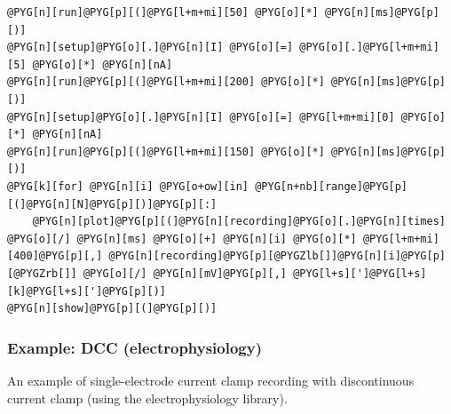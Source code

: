 \documentclass[letterpaper,10pt,english]{manual}
\begin{document}
\begin{Verbatim}[commandchars=@\[\]]
@PYG[n][run]@PYG[p][(]@PYG[l+m+mi][50] @PYG[o][*] @PYG[n][ms]@PYG[p][)]
@PYG[n][setup]@PYG[o][.]@PYG[n][I] @PYG[o][=] @PYG[o][.]@PYG[l+m+mi][5] @PYG[o][*] @PYG[n][nA]
@PYG[n][run]@PYG[p][(]@PYG[l+m+mi][200] @PYG[o][*] @PYG[n][ms]@PYG[p][)]
@PYG[n][setup]@PYG[o][.]@PYG[n][I] @PYG[o][=] @PYG[l+m+mi][0] @PYG[o][*] @PYG[n][nA]
@PYG[n][run]@PYG[p][(]@PYG[l+m+mi][150] @PYG[o][*] @PYG[n][ms]@PYG[p][)]
@PYG[k][for] @PYG[n][i] @PYG[o+ow][in] @PYG[n+nb][range]@PYG[p][(]@PYG[n][N]@PYG[p][)]@PYG[p][:]
    @PYG[n][plot]@PYG[p][(]@PYG[n][recording]@PYG[o][.]@PYG[n][times] @PYG[o][/] @PYG[n][ms] @PYG[o][+] @PYG[n][i] @PYG[o][*] @PYG[l+m+mi][400]@PYG[p][,] @PYG[n][recording]@PYG[p][@PYGZlb[]]@PYG[n][i]@PYG[p][@PYGZrb[]] @PYG[o][/] @PYG[n][mV]@PYG[p][,] @PYG[l+s][']@PYG[l+s][k]@PYG[l+s][']@PYG[p][)]
@PYG[n][show]@PYG[p][(]@PYG[p][)]
\end{Verbatim}

\resetcurrentobjects
\hypertarget{--doc-examples-electrophysiology_DCC}{}

\hypertarget{index-23}{}\subsubsection{Example: DCC (electrophysiology)}

An example of single-electrode current clamp recording
with discontinuous current clamp (using the electrophysiology library).
\end{document}
